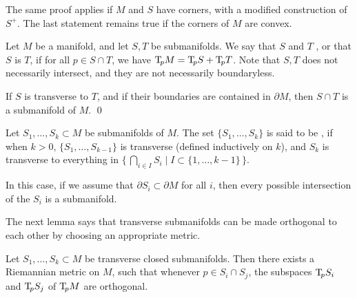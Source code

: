\begin{remark}
The same proof applies if $M$ and $S$ have corners,
with a modified construction of $S^+$.
The last statement remains true
if the corners of $M$ are convex. \varqed
\end{remark}

\begin{definition}
Let $M$ be a manifold, and let $S,T$ be submanifolds.
We say that $S$ and $T$ ,
or that $S$ is  $T$,
if for all $p\in S\cap T$, we have $\mathrm{T}\!_pM=\mathrm{T}\!_pS+\mathrm{T}\!_pT$.
Note that $S,T$ does not necessarily intersect, and they are not necessarily boundaryless. \varqed
\end{definition}

\begin{proposition} \label{thm-transverse}
If $S$ is transverse to $T$,
and if their boundaries are contained in $\partial M$,
then $S\cap T$ is a submanifold of $M$.
\qed
\end{proposition}

\begin{definition}
Let $S_1,\dotsc,S_k\subset M$ be submanifolds of $M$.
The set $\{S_1,\dotsc,S_k\}$ is said to be ,
if when $k>0$, $\{S_1,\dotsc,S_{k-1}\}$ is transverse (defined inductively on $k$),
and $S_k$ is transverse to everything in
$\bigl\{\,\bigcap_{i\in I}S_i\mid I\subset\{1,\dotsc,k-1\}\,\bigr\}$. \varqed
\end{definition}

In this case, if we assume that $\partial S_i \subset \partial M$ for all $i$,
then every possible intersection of the $S_i$ is a submanifold.

The next lemma says that 
transverse submanifolds can be made orthogonal to each other
by choosing an appropriate metric.

\begin{lemma}\label{lem:orthogonal}
Let $S_1,\dotsc,S_k\subset M$ be transverse closed submanifolds.
Then there exists a Riemannian metric on $M$,
such that whenever $p\in S_i\cap S_j$,
the subspaces $\mathrm{T}\!_pS_i$ and $\mathrm{T}\!_pS_j$ of $\mathrm{T}\!_pM$ are orthogonal.
\end{lemma}

